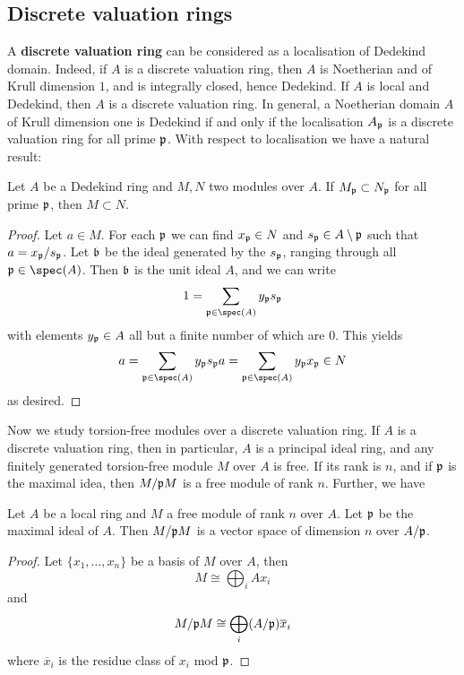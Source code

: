 		\subsection{Discrete valuation rings}
			A \textbf{discrete valuation ring} can be considered as a localisation of Dedekind domain. Indeed, if $A$ is a discrete valuation ring, then $A$ is Noetherian and of Krull dimension $1$, and is integrally closed, hence Dedekind. If $A$ is local and Dedekind, then $A$ is a discrete valuation ring. In general, a Noetherian domain $A$ of Krull dimension one is Dedekind if and only if the localisation $A_\mathfrak{p}$ is a discrete valuation ring for all prime $\mathfrak{p}$. With respect to localisation we have a natural result:
			\begin{theorem}
				Let $A$ be a Dedekind ring and $M,N$ two modules over $A$. If $M_\mathfrak{p} \subset N_\mathfrak{p}$ for all prime $\mathfrak{p}$, then $M \subset N$.
			\end{theorem}
			\begin{proof}
				Let $a \in M$. For each $\mathfrak{p}$ we can find $x_\mathfrak{p} \in N$ and $s_\mathfrak{p} \in A \setminus \mathfrak{p}$ such that $a = x_\mathfrak{p}/s_\mathfrak{p}$. Let $\mathfrak{b}$ be the ideal generated by the $s_\mathfrak{p}$, ranging through all $\mfk{p} \in \spec(A)$. Then $\mathfrak{b}$ is the unit ideal $A$, and we can write
				\[
					1 = \sum_{\mfk{p} \in \spec(A)} y_\mfk{p}s_\mfk{p}
				\]
				with elements $y_\mathfrak{p} \in A$ all but a finite number of which are $0$. This yields
				\[
					a = \sum_{\mfk{p} \in \spec(A)} y_\mfk{p}s_\mfk{p}a = \sum_{\mfk{p} \in \spec(A)} y_\mfk{p}x_\mfk{p} \in N
				\]
				as desired.
			\end{proof}
		
			Now we study torsion-free modules over a discrete valuation ring. If $A$ is a discrete valuation ring, then in particular, $A$ is a principal ideal ring, and any finitely generated torsion-free module $M$ over $A$ is free. If its rank is $n$, and if $\mathfrak{p}$ is the maximal idea, then $M/\mathfrak{p}M$ is a free module of rank $n$. Further, we have
			\begin{theorem}
				Let $A$ be a local ring and $M$ a free module of rank $n$ over $A$. Let $\mathfrak{p}$ be the maximal ideal of $A$. Then $M/\mathfrak{p}M$ is a vector space of dimension $n$ over $A/\mathfrak{p}$.
			\end{theorem}
			\begin{proof}
				Let $\{x_1,\dots,x_n\}$ be a basis of $M$ over $A$, then
				\[
					M \cong \bigoplus_{i}Ax_i
				\]
				and
				\[
					M/\mathfrak{p}M \cong \bigoplus_{i}(A/\mathfrak{p})\overline{x}_i
				\]
				where $\overline{x}_i$ is the residue class of $x_i$ mod $\mathfrak{p}$.
			\end{proof}
